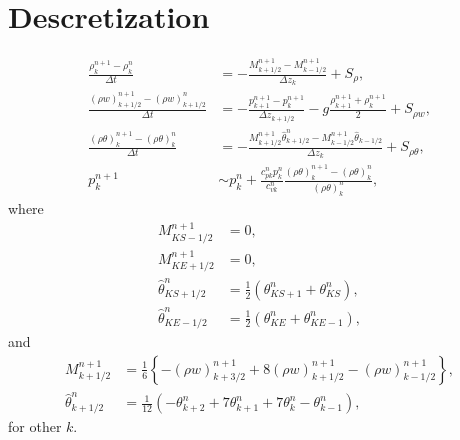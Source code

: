 \section{Descretization}
\begin{align}
  \frac{\rho_k^{n+1}-\rho_k^n}{\Delta t}
  &= -\frac{M_{k+1/2}^{n+1}-M_{k-1/2}^{n+1}}{\Delta z_k} + S_\rho, \\
  \frac{(\rho w)_{k+1/2}^{n+1}-(\rho w)_{k+1/2}^n}{\Delta t}
  &= -\frac{p_{k+1}^{n+1}-p_k^{n+1}}{\Delta z_{k+1/2}} -g\frac{\rho_{k+1}^{n+1}+\rho_k^{n+1}}{2} + S_{\rho w}, \\
  \frac{(\rho\theta)_k^{n+1}-(\rho\theta)_k^n}{\Delta t}
  &= -\frac{M_{k+1/2}^{n+1}\hat{\theta}_{k+1/2}^n-M_{k-1/2}^{n+1}\hat{\theta}_{k-1/2}}{\Delta z_k} + S_{\rho\theta}, \\
  p_k^{n+1} &\sim p_k^n + \frac{c_{p k}^np_k^n}{c_{v k}^n}\frac{(\rho\theta)_k^{n+1}-(\rho\theta)_k^n}{(\rho\theta)_k^n},
\end{align}
where
\begin{align}
  M_{KS-1/2}^{n+1} &= 0, \\
  M_{KE+1/2}^{n+1} &= 0, \\
  \hat\theta_{KS+1/2}^n &= \frac{1}{2}(\theta_{KS+1}^n+\theta_{KS}^n), \\
  \hat\theta_{KE-1/2}^n &= \frac{1}{2}(\theta_{KE}^n+\theta_{KE-1}^n),
\end{align}
and
\begin{align}
  M_{k+1/2}^{n+1}
  &= \frac{1}{6}\left\{-(\rho w)_{k+3/2}^{n+1}+8(\rho w)_{k+1/2}^{n+1}-(\rho w)_{k-1/2}^{n+1}\right\}, \\
  \hat{\theta}_{k+1/2}^n
  &= \frac{1}{12}(-\theta_{k+2}^n+7\theta_{k+1}^n+7\theta_k^n-\theta_{k-1}^n),
\end{align}
for other $k$.

